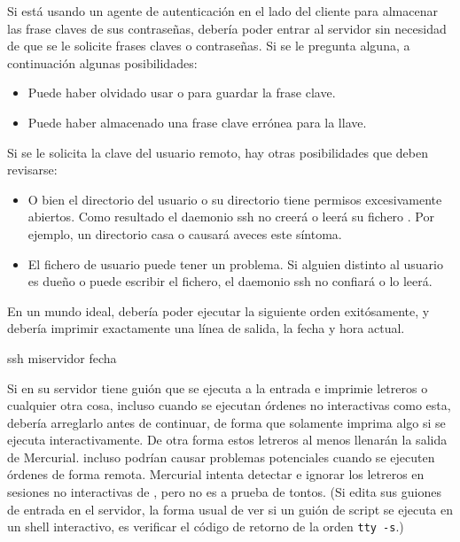 Si está usando un agente de autenticación en el lado del cliente para
almacenar las frase claves de sus contraseñas, debería poder entrar al
servidor sin necesidad de que se le solicite frases claves o
contraseñas.  Si se le pregunta alguna, a continuación algunas
posibilidades:
\begin{itemize}
\item Puede haber olvidado usar  o
   para guardar la frase clave.
\item Puede haber almacenado una frase clave errónea para la llave.
\end{itemize}
Si se le solicita la clave del usuario remoto, hay otras posibilidades
que deben revisarse:
\begin{itemize}
\item O bien el directorio del usuario o su directorio 
  tiene permisos excesivamente abiertos.  Como resultado el daemonio
  ssh no creerá o leerá su fichero .  
  Por ejemplo, un directorio casa o  causará aveces
  este síntoma.
\item El fichero de usuario  puede tener
  un problema.  Si alguien distinto al usuario es dueño o puede
  escribir el fichero, el daemonio ssh no confiará o lo leerá.
\end{itemize}

En un mundo ideal, debería poder ejecutar la siguiente orden
exitósamente, y debería imprimir exactamente una línea de salida,
la fecha y hora actual.
\begin{codesample2}
  ssh miservidor fecha
\end{codesample2}

Si en su servidor tiene guión que se ejecuta a la entrada e imprimie
letreros o cualquier otra cosa, incluso cuando se ejecutan órdenes no
interactivas como esta, debería arreglarlo antes de continuar, de
forma que solamente imprima algo si se ejecuta interactivamente.  De
otra forma estos letreros al menos llenarán la salida de Mercurial.
incluso podrían causar problemas potenciales cuando se ejecuten
órdenes de forma remota.  Mercurial intenta detectar e ignorar los
letreros en sesiones no interactivas de , pero no es
a prueba de tontos.  (Si edita sus guiones de entrada en el servidor,
la forma usual de ver si un guión de script se ejecuta en un shell
interactivo, es verificar el código de retorno de la orden
\Verb|tty -s|.)

